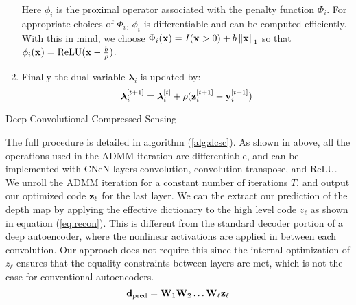 \begin{enumerate}
  Here $\phi_i$ is the proximal operator associated with the penalty function $\Phi_i$. For appropriate choices of $\Phi_i$, $\phi_i$ is differentiable and can be computed efficiently. With this in mind, we choose $\Phi_i(\mathbf{x}) = I(\mathbf{x} > 0) + b\left\Vert\mathbf{x}\right\Vert_1$ so that $\phi_i(\mathbf{x}) = \text{ReLU}(\mathbf{x} - \frac{b}{\rho})$.
\item Finally the dual variable $\bm{\lambda}_i$ is updated by:
  \begin{equation}
    \label{eq:lupdate}
    \bm{\lambda}_i^{[t+1]} = \bm{\lambda}_i^{[t]} + \rho(\mathbf{z}_i^{[t+1]} - \mathbf{y}_i^{[t+1]})
  \end{equation}
\end{enumerate}
\begin{algorithm}
  \caption{Deep Convolutional Compressed Sensing}
  \label{alg:dcsc}
\end{algorithm}

The full procedure is detailed in algorithm (\ref{alg:dcsc}).
As shown in above, all the operations used in the ADMM iteration are differentiable, and can be implemented with CNeN layers \eg convolution, convolution transpose, and ReLU. We unroll the ADMM iteration for a constant number of iterations $T$, and output our optimized code $\mathbf{z}_\ell$ for the last layer.
We can the extract our prediction of the depth map by applying the effective dictionary to the high level code $z_{\ell}$ as shown in equation (\ref{eq:recon}). This is different from the standard decoder portion of a deep autoencoder, where the nonlinear activations are applied in between each convolution. Our approach does not require this since the internal optimization of $z_{\ell}$ ensures that the equality constraints between layers are met, which is not the case for conventional autoencoders.
\begin{equation}
  \label{eq:recon}
  \mathbf{d}_\text{pred} = \mathbf{W}_1\mathbf{W}_2\ldots \mathbf{W}_{\ell}\mathbf{z}_{\ell}
\end{equation}

